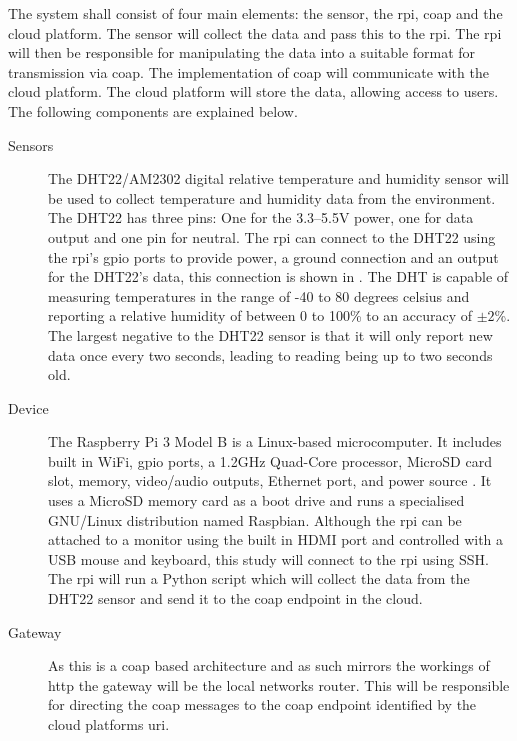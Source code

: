 The system shall consist of four main elements: the sensor, the \gls{rpi}, \gls{coap} and the cloud platform.
The sensor will collect the data and pass this to the \gls{rpi}. The \gls{rpi} will then be responsible for manipulating
the data into a suitable format for transmission via \gls{coap}. The implementation of \gls{coap} will communicate with
the cloud platform. The cloud platform will store the data, allowing access to users.
The following components are explained below.

\begin{description}
    \item[Sensors] 
    The DHT22/AM2302 digital relative temperature and humidity 
    sensor will be used to collect temperature and humidity data from the environment.
    The DHT22 has three pins: One for the 3.3--5.5V power, one for data output and
    one pin for neutral. The \gls{rpi} can connect to the DHT22 using the \gls{rpi}'s 
    \gls{gpio} ports to provide power, a ground connection and an output for the 
    DHT22's data, this connection is shown in . The DHT 
    is capable of measuring temperatures in the range of -40 to 80 degrees celsius
    and reporting a relative humidity of between 0 to 100\% to an accuracy of $\pm2$\%.
    The largest negative to the DHT22 sensor is that it will only report new data
    once every two seconds, leading to reading being up to two seconds old.

    \item[Device]
    The Raspberry Pi 3 Model B is a Linux-based microcomputer.
    It includes built in WiFi, \gls{gpio} ports, a 1.2GHz Quad-Core processor,
    MicroSD card slot, memory, video/audio outputs, Ethernet port, and power source 
    \citep{pi_model_2018}. 
    It uses a MicroSD memory card as a boot drive and runs a specialised 
    GNU/Linux distribution named Raspbian. Although the \gls{rpi} can be attached
    to a monitor using the built in HDMI port and controlled with a USB mouse and
    keyboard, this study will connect to the \gls{rpi} using SSH. The \gls{rpi} 
    will run a Python script which will collect the data from the DHT22 sensor 
    and send it to the \gls{coap} endpoint in the cloud.

    \item[Gateway]
    As this is a \gls{coap} based architecture and as such mirrors the workings
    of \gls{http} the gateway will be the local networks router. This will be 
    responsible for directing the \gls{coap} messages to the \gls{coap} endpoint
    identified by the cloud platforms \gls{uri}.


\end{description}
